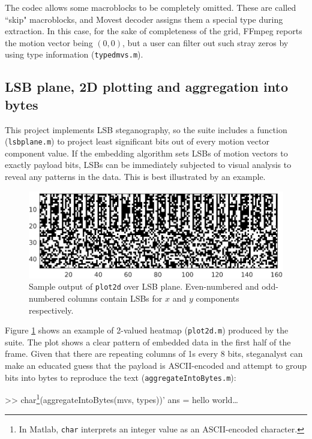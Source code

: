 \documentclass[12pt,british,twoside,notitlepage,usenames,dvipsnames,hypens,final]{report}
\numberwithin{equation}{section}
\numberwithin{figure}{section}
\renewenvironment{alltt}{\vspace{-0.6\baselineskip}\begin{oldalltt}}{\end{oldalltt}\vspace{-0.1\baselineskip}}
\begin{document}
The codec allows some macroblocks to be completely omitted. These are called ``skip" macroblocks, and Movest decoder assigns them a special type during extraction. In this case, for the sake of completeness of the grid, FFmpeg reports the motion vector being $(0, 0)$, but a user can filter out such stray zeros by using type information (\texttt{typedmvs.m}).

\subsection{LSB plane, 2D plotting and aggregation into bytes}

This project implements LSB steganography, so the suite includes a function (\texttt{lsbplane.m}) to project least significant bits out of every motion vector component value. If the embedding algorithm sets LSBs of motion vectors to exactly payload bits, LSBs can be immediately subjected to visual analysis to reveal any patterns in the data. This is best illustrated by an example.

\begin{figure}[tbh]
\centerline{\includegraphics{img/unencrypted-enc.eps}}
\caption{Sample output of \texttt{plot2d} over LSB plane. Even-numbered and odd-numbered columns contain LSBs for $x$ and $y$ components respectively.}
\label{fig:unencrypted-enc}
\end{figure}

Figure \ref{fig:unencrypted-enc} shows an example of 2-valued heatmap (\texttt{plot2d.m}) produced by the suite. The plot shows a clear pattern of embedded data in the first half of the frame. Given that there are repeating columns of 1s every 8 bits, steganalyst can make an educated guess that the payload is ASCII-encoded and attempt to group bits into bytes to reproduce the text (\texttt{aggregateIntoBytes.m}):

\begin{alltt}
    >> char\footnote{In Matlab, \texttt{char} interprets an integer value as an ASCII-encoded character.}(aggregateIntoBytes(mvs, types))'
    ans = hello world\ldots
\end{alltt}
\end{document}
